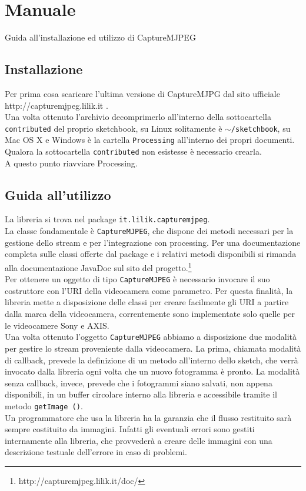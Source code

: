 \documentclass[a4paper,11pt]{article}
\begin{document}
\section{Manuale}
\label{sec:manuale}
Guida all'installazione ed utilizzo di CaptureMJPEG
\subsection{Installazione}
\label{sec:installazione}
Per prima cosa scaricare l'ultima versione di CaptureMJPG dal sito
ufficiale http://capturemjpeg.lilik.it .\\
Una volta ottenuto l'archivio decomprimerlo all'interno della
sottocartella \texttt{contributed} del proprio sketchbook, su Linux
solitamente è \texttt{$\sim$/sketchbook}, su Mac OS X e Windows
è la cartella \texttt{Processing} all'interno dei propri documenti.\\
Qualora la sottocartella \texttt{contributed} non esistesse è
necessario crearla.\\
A questo punto riavviare Processing. 
\subsection{Guida all'utilizzo}
\label{sec:guida}
La libreria si trova nel package \texttt{it.lilik.capturemjpeg}.\\
La classe fondamentale \`e \texttt{CaptureMJPEG}, che dispone dei metodi
necessari per la gestione dello stream e per l'integrazione con processing.
Per una documentazione completa sulle classi offerte dal package e i relativi
metodi disponibili si rimanda alla documentazione JavaDoc sul sito del 
progetto.\footnote{http://capturemjpeg.lilik.it/doc/}\\

Per ottenere un oggetto di tipo \texttt{CaptureMJPEG} \`e necessario invocare
il suo costruttore con l'URI della videocamera come parametro. Per questa
finalit\`a, la libreria mette a disposizione delle classi per creare facilmente
gli URI a partire dalla marca della videocamera, correntemente sono
implementate solo quelle per le videocamere Sony e AXIS.\\
Una volta ottenuto l'oggetto \texttt{CaptureMJPEG} abbiamo a disposizione due
modalit\`a per gestire lo stream proveniente dalla videocamera. La prima,
chiamata modalit\`a di callback, prevede la definizione di un metodo
all'interno dello sketch, che verr\`a invocato dalla libreria ogni volta che
un nuovo fotogramma \`e pronto. La modalit\`a senza callback, invece, prevede
che i fotogrammi siano salvati, non appena disponibili, in un buffer circolare
interno alla libreria e accessibile tramite il metodo \texttt{getImage ()}.\\
Un programmatore che usa la libreria ha la garanzia che il flusso restituito
sar\`a sempre costituito da immagini. Infatti gli eventuali errori sono gestiti
internamente alla libreria, che provveder\`a a creare delle immagini con una
descrizione testuale dell'errore in caso di problemi.
\end{document}
